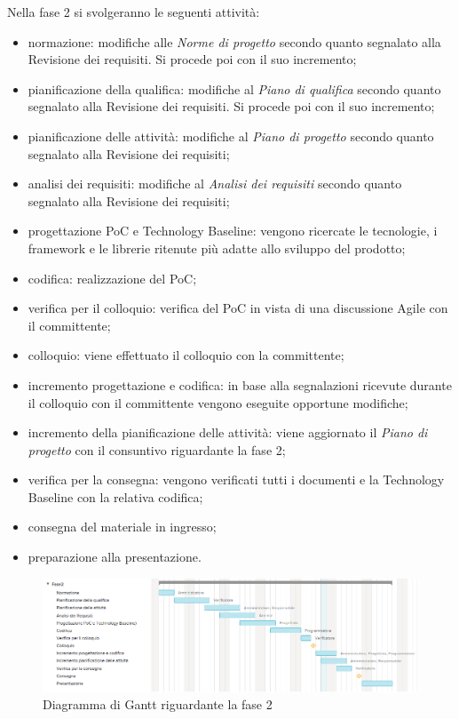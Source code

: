 Nella fase 2 si svolgeranno le seguenti attività:
\begin{itemize}
	\item normazione: modifiche alle \textit{Norme di progetto} secondo quanto segnalato alla Revisione dei requisiti. Si procede poi con il suo incremento;
	\item pianificazione della qualifica: modifiche al \textit{Piano di qualifica} secondo quanto segnalato alla Revisione dei requisiti. Si procede poi con il suo incremento;
	\item pianificazione delle attività: modifiche al \textit{Piano di progetto} secondo quanto segnalato alla Revisione dei requisiti;
	\item analisi dei requisiti: modifiche al \textit{Analisi dei requisiti} secondo quanto segnalato alla Revisione dei requisiti;
	\item progettazione PoC e Technology Baseline: vengono ricercate le tecnologie, i framework e le librerie ritenute più adatte allo sviluppo del prodotto;
	\item codifica: realizzazione del PoC;
	\item verifica per il colloquio: verifica del PoC in vista di una discussione Agile con il committente;
	\item colloquio: viene effettuato il colloquio con la committente;
	\item incremento progettazione e codifica: in base alla segnalazioni ricevute durante il colloquio con il committente vengono eseguite opportune modifiche;
	\item incremento della pianificazione delle attività: viene aggiornato il \textit{Piano di progetto} con il consuntivo riguardante la fase 2;
	\item verifica per la consegna: vengono verificati tutti i documenti e la Technology Baseline con la relativa codifica;
	\item consegna del materiale in ingresso;
	\item preparazione alla presentazione.
\end{itemize}

\begin{figure}[h]
	\centering
	\includegraphics[scale=0.67]{images/fase2.png}
	\caption{Diagramma di Gantt riguardante la fase 2}
\end{figure}